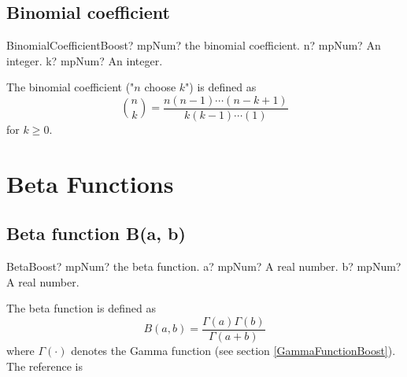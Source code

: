 \subsection{Binomial coefficient}

\begin{mpFunctionsExtract}
	\mpFunctionTwo
	{BinomialCoefficientBoost? mpNum? the binomial coefficient.}
	{n? mpNum? An integer.}
	{k? mpNum? An integer.}
\end{mpFunctionsExtract}

\vspace{0.3cm}
The binomial coefficient ("$n$ choose $k$") is defined as
\begin{equation}
	\binom{n}{k} = \frac{n(n-1) \cdots (n-k+1)}{k(k-1) \cdots (1)}
\end{equation}
for $k \geq 0$.





\section{Beta Functions}



\subsection{Beta function B(a, b)}
\label{BetaFunctionBoost}

\begin{mpFunctionsExtract}
	\mpFunctionTwo
	{BetaBoost? mpNum? the beta function.}
	{a? mpNum? A real number.}
	{b? mpNum? A real number.}
\end{mpFunctionsExtract}

\vspace{0.3cm}
The beta function is defined as
\begin{equation}
	B(a,b) = \frac{\Gamma(a)\Gamma(b)}{\Gamma(a+b)}
\end{equation}
where $\Gamma(\cdot)$ denotes the Gamma function (see section \ref{GammaFunctionBoost}).
The reference is \cite{Didonato_1992}


